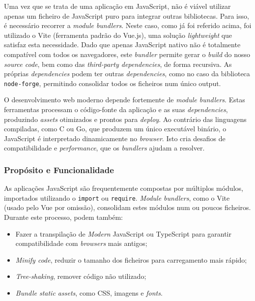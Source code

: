 Uma vez que se trata de uma aplicação em JavaScript, não é viável utilizar apenas um ficheiro de JavaScript puro para integrar outras bibliotecas. Para isso, é necessário recorrer a \textit{module bundlers}. Neste caso, como já foi referido acima, foi utilizado o Vite (ferramenta padrão do Vue.js), uma solução \textit{lightweight} que satisfaz esta necessidade. Dado que apenas JavaScript nativo não é totalmente compatível com todos os navegadores, este \textit{bundler} permite gerar o \textit{build} do nosso \textit{source code}, bem como das \textit{third-party dependencies}, de forma recursiva. As próprias \textit{dependencies} podem ter outras \textit{dependencies}, como no caso da biblioteca \texttt{node-forge}, permitindo consolidar todos os ficheiros num único output.

O desenvolvimento web moderno depende fortemente de \textit{module bundlers}. Estas ferramentas processam o código-fonte da aplicação e as suas \textit{dependencies}, produzindo \textit{assets} otimizados e prontos para \textit{deploy}. Ao contrário das linguagens compiladas, como C ou Go, que produzem um único executável binário, o JavaScript é interpretado dinamicamente no \textit{browser}. Isto cria desafios de compatibilidade e \textit{performance}, que os \textit{bundlers} ajudam a resolver.

\subsubsection{Propósito e Funcionalidade}

As aplicações JavaScript são frequentemente compostas por múltiplos módulos, importados utilizando o \texttt{import} ou \texttt{require}. \textit{Module bundlers}, como o Vite (usado pelo Vue por omissão), consolidam estes módulos num ou poucos ficheiros. Durante este processo, podem também:

\begin{itemize}
    \item Fazer a transpilação de \textit{Modern} JavaScript ou TypeScript para garantir compatibilidade com \textit{browsers} mais antigos;
    \item \textit{Minify code}, reduzir o tamanho dos ficheiros para carregamento mais rápido;
    \item \textit{Tree-shaking}, remover código não utilizado;
    \item \textit{Bundle static assets}, como CSS, imagens e \textit{fonts}.
\end{itemize}


